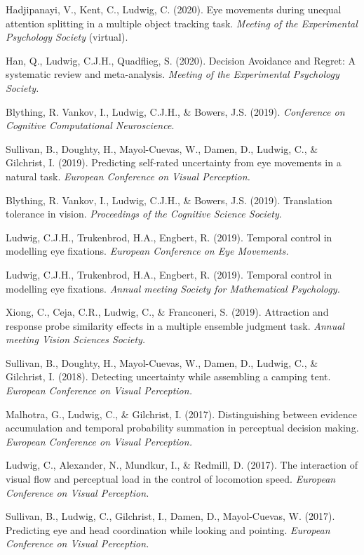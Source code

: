 \documentclass[a4paper, 10pt]{article}
\renewenvironment{itemize}{
  \begin{list}{}{
    \setlength{\leftmargin}{1.5em}
  }
}{
  \end{list}
}
\begin{document}
\begin{itemize}
\item Hadjipanayi, V., Kent, C., Ludwig, C. (2020). Eye movements during unequal attention splitting in a multiple object tracking task. \textit{Meeting of the Experimental Psychology Society} (virtual). 
\item Han, Q., Ludwig, C.J.H., Quadflieg, S. (2020). Decision Avoidance and Regret: A systematic review and meta-analysis. \textit{Meeting of the Experimental Psychology Society.}
\item Blything, R. Vankov, I., Ludwig, C.J.H., \& Bowers, J.S. (2019). \textit{Conference on Cognitive Computational Neuroscience}.
\item Sullivan, B., Doughty, H., Mayol-Cuevas, W., Damen, D., Ludwig, C., \& Gilchrist, I. (2019). Predicting self-rated uncertainty from eye movements in a natural task. \textit{European Conference on Visual Perception.}
\item Blything, R. Vankov, I., Ludwig, C.J.H., \& Bowers, J.S. (2019). Translation tolerance in vision. \textit{Proceedings of the Cognitive Science Society}.
\item Ludwig, C.J.H., Trukenbrod, H.A., Engbert, R. (2019). Temporal control in modelling eye fixations. \textit{European Conference on Eye Movements.}
\item Ludwig, C.J.H., Trukenbrod, H.A., Engbert, R. (2019). Temporal control in modelling eye fixations. \textit{Annual meeting Society for Mathematical Psychology.}
\item  Xiong, C., Ceja, C.R., Ludwig, C., \& Franconeri, S. (2019). Attraction and response probe similarity effects in a multiple ensemble judgment task. \textit{Annual meeting Vision Sciences Society.}
\item Sullivan, B., Doughty, H., Mayol-Cuevas, W., Damen, D., Ludwig, C., \& Gilchrist, I. (2018). Detecting uncertainty while assembling a camping tent. \textit{European Conference on Visual Perception.}
\item Malhotra, G., Ludwig, C., \& Gilchrist, I. (2017). Distinguishing between evidence accumulation and temporal probability summation in perceptual decision making. \textit{European Conference on Visual Perception.}
\item Ludwig, C., Alexander, N., Mundkur, I., \& Redmill, D. (2017). The interaction of visual flow and perceptual load in the control of locomotion speed. \textit{European Conference on Visual Perception.}
\item Sullivan, B., Ludwig, C., Gilchrist, I., Damen, D., Mayol-Cuevas, W. (2017). Predicting eye and head coordination while looking and pointing. \textit{European Conference on Visual Perception.}

\end{itemize}
\end{document}
